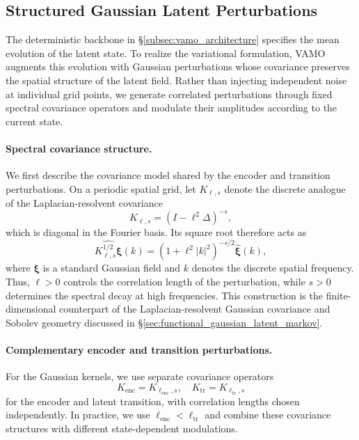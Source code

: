 \documentclass[11pt]{article}
\begin{document}
\subsection{Structured Gaussian Latent Perturbations}
\label{subsec:structured_latent_perturbations}

The deterministic backbone in \S\ref{subsec:vamo_architecture} specifies the mean evolution of the latent state. To realize the variational formulation, VAMO augments this evolution with Gaussian perturbations whose covariance preserves the spatial structure of the latent field. Rather than injecting independent noise at individual grid points, we generate correlated perturbations through fixed spectral covariance operators and modulate their amplitudes according to the current state.

\paragraph{Spectral covariance structure.}
We first describe the covariance model shared by the encoder and transition perturbations. On a periodic spatial grid, let $K_{\ell,s}$ denote the discrete analogue of the Laplacian-resolvent covariance
\[
    K_{\ell,s}
    =
    (I-\ell^2\Delta)^{-s},
\]
which is diagonal in the Fourier basis. Its square root therefore acts as
\begin{equation}
    \widehat{K_{\ell,s}^{1/2}\boldsymbol\xi}(k)
    =
    \left(1+\ell^2|k|^2\right)^{-s/2}
    \widehat{\boldsymbol\xi}(k),
    \label{eq:discrete_spectral_filter}
\end{equation}
where $\boldsymbol\xi$ is a standard Gaussian field and $k$ denotes the discrete spatial frequency. Thus, $\ell>0$ controls the correlation length of the perturbation, while $s>0$ determines the spectral decay at high frequencies. This construction is the finite-dimensional counterpart of the Laplacian-resolvent Gaussian covariance and Sobolev geometry discussed in \S\ref{sec:functional_gaussian_latent_markov}.

\paragraph{Complementary encoder and transition perturbations.}
For the Gaussian kernels, we use separate covariance operators
\[
    K_{\mathrm{enc}}=K_{\ell_{\mathrm{enc}},s},
    \quad
    K_{\mathrm{tr}}=K_{\ell_{\mathrm{tr}},s}
\]
for the encoder and latent transition, with correlation lengths chosen independently. In practice, we use $\ell_{\mathrm{enc}}<\ell_{\mathrm{tr}}$ and combine these covariance structures with different state-dependent modulations.
\end{document}
